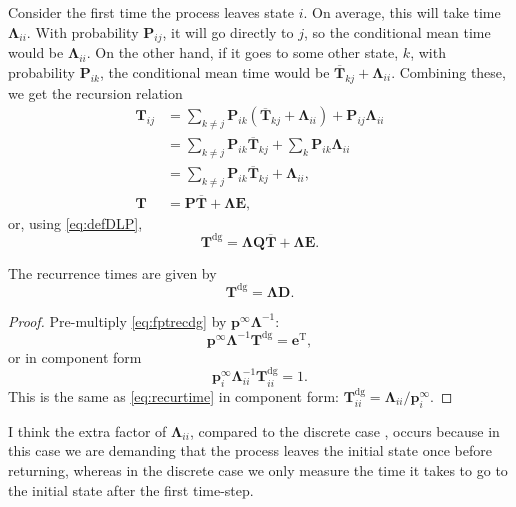 \documentclass[12pt]{article}
\newcommand{\inv}{^{-1}}
\newcommand{\dg}{^\mathrm{dg}}
\newcommand{\trans}{^\mathrm{T}}
\newcommand{\onev}{\mathbf{e}}
\newcommand{\onem}{\mathbf{E}}
\newcommand{\MM}{\mathbf{Q}}
\newcommand{\eq}{\mathbf{p}^\infty}
\newcommand{\fpt}{\mathbf{T}}
\newcommand{\fptb}{\overline{\fpt}}
\newcommand{\Pb}{\mathbf{P}}
\newcommand{\D}{\mathbf{D}}
\newcommand{\Lb}{\boldsymbol{\Lambda}}
\begin{document}
Consider the first time the process leaves state $i$.
On average, this will take time $\Lb_{ii}$.
With probability $\Pb_{ij}$, it will go directly to $j$, so the conditional mean time would be $\Lb_{ii}$.
On the other hand, if it goes to some other state, $k$, with probability $\Pb_{ik}$, the conditional mean time would be $\fptb_{kj}+\Lb_{ii}$.
Combining these, we get the recursion relation
%
\begin{equation}\label{eq:fptrecursion}
  \begin{aligned}
  \fpt_{ij} &= \sum_{k\neq j} \Pb_{ik}(\fptb_{kj}+\Lb_{ii}) + \Pb_{ij}\Lb_{ii} \\
    &= \sum_{k\neq j} \Pb_{ik}\fptb_{kj} + \sum_{k} \Pb_{ik}\Lb_{ii}\\
    &= \sum_{k\neq j} \Pb_{ik}\fptb_{kj} + \Lb_{ii},\\
   \fpt &= \Pb \fptb + \Lb\onem,
  \end{aligned}
\end{equation}
%
or, using \eqref{eq:defDLP},
%
\begin{equation}\label{eq:fptrecdg}
  \fpt\dg = \Lb\MM\fptb+\Lb\onem.
\end{equation}
%

\begin{thm}
  The recurrence times are given by
  \begin{equation}\label{eq:recurtime}
    \fpt\dg = \Lb\D.
  \end{equation}
\end{thm}
\begin{proof}
  Pre-multiply \eqref{eq:fptrecdg} by $\eq\Lb\inv$:
  \begin{equation*}
    \eq\Lb\inv\fpt\dg = \onev\trans,
  \end{equation*}
  or in component form
  \begin{equation*}
    \eq_i \Lb_{ii}\inv \fpt\dg_{ii} = 1.
  \end{equation*}
  This is the same as \eqref{eq:recurtime} in component form: $\fpt\dg_{ii} = \Lb_{ii}/\eq_i$.
\end{proof}
I think the extra factor of $\Lb_{ii}$, compared to the discrete case \cite[Th.4.4.5]{kemeny1960finite}, occurs because in this case we are demanding that the process leaves the initial state once before returning, whereas in the discrete case we only measure the time it takes to go to the initial state after the first time-step.
\end{document}

